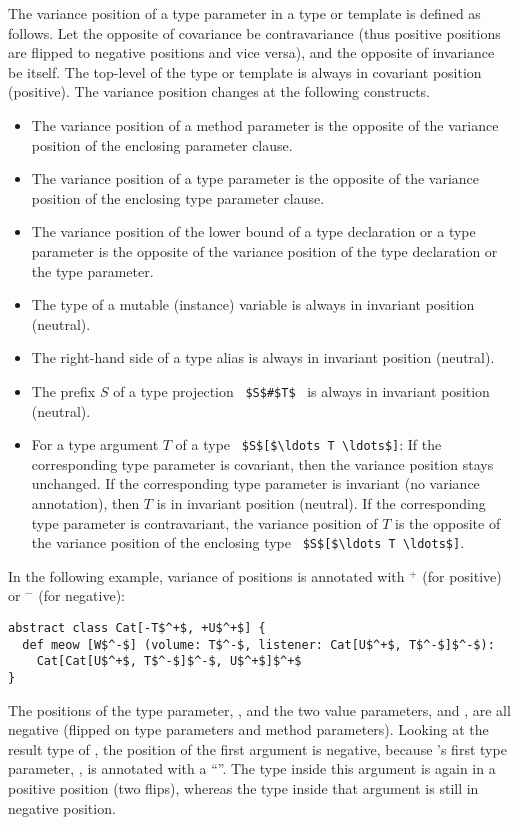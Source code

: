 The variance position of a type parameter in a type or template is defined as follows. Let the opposite of covariance be contravariance (thus positive positions are flipped to negative positions and vice versa), and the opposite of invariance be itself. The top-level of the type or template is always in covariant position (positive). The variance position changes at the following constructs. 
\begin{itemize}
  \item The variance position of a method parameter is the opposite of the variance position of the enclosing parameter clause. 
  \item The variance position of a type parameter is the opposite of the variance position of the enclosing type parameter clause. 
  \item The variance position of the lower bound of a type declaration or a type parameter is the opposite of the variance position of the type declaration or the type parameter. 
  \item The type of a mutable (instance) variable is always in invariant position (neutral). 
  \item The right-hand side of a type alias is always in invariant position (neutral). 
  \item The prefix $S$ of a type projection ~\lstinline!$S$#$T$!~ is always in invariant position (neutral). 
  \item For a type argument $T$ of a type ~\lstinline!$S$[$\ldots T \ldots$]!: If the corresponding type parameter is covariant, then the variance position stays unchanged. If the corresponding type parameter is invariant (no variance annotation), then $T$ is in invariant position (neutral). If the corresponding type parameter is contravariant, the variance position of $T$ is the opposite of the variance position of the enclosing type ~\lstinline!$S$[$\ldots T \ldots$]!. 
\end{itemize}

\example In the following example, variance of positions is annotated with $^+$ (for positive) or $^-$ (for negative):
\begin{lstlisting}
abstract class Cat[-T$^+$, +U$^+$] {
  def meow [W$^-$] (volume: T$^-$, listener: Cat[U$^+$, T$^-$]$^-$):
    Cat[Cat[U$^+$, T$^-$]$^-$, U$^+$]$^+$
}
\end{lstlisting}
The positions of the type parameter, , and the two value parameters,  and , are all negative (flipped on type parameters and method parameters). Looking at the result type of , the position of the first  argument is negative, because 's first type parameter, , is annotated with a ``\code{-}''. The type  inside this argument is again in a positive position (two flips), whereas the type  inside that argument is still in negative position. 

